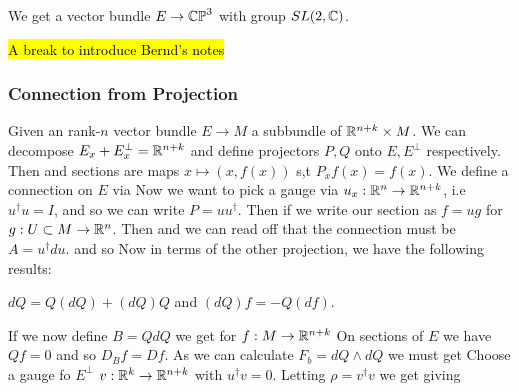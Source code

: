 \documentclass{article}
\begin{document}
\begin{corollary}
	We get a vector bundle $E\to \mathbb{CP}^3$ with group $SL(2,\mathbb{C})$.
\end{corollary}


\hl{A break to introduce Bernd's notes}

\subsubsection{Connection from Projection}
Given an rank-$n$ vector bundle $E \to M$ a subbundle of $\mathbb{R}^{n+k} \times M$. We can decompose $E_x + E_x^\perp = \mathbb{R}^{n+k}$ and define projectors $P,Q$ onto $E,E^\perp$ respectively. Then 
and sections are maps $x \mapsto (x,f(x))$ s,t $P_xf(x) = f(x)$. We define a connection on $E$ via 
Now we want to pick a gauge via $u_x: \mathbb{R}^n \to \mathbb{R}^{n+k}$, i.e $u^\dagger u = I$, and so we can write $P = uu^\dagger$. Then if we write our section as $f=ug$ for $g:U \subset M \to \mathbb{R}^n$. Then
and we can read off that the connection must be $A = u^\dagger du$. and so 
Now in terms of the other projection, we have the following results:
\begin{lemma}
	$dQ = Q(dQ) + (dQ)Q$ and $(dQ)f = -Q(df)$. 
\end{lemma} 
If we now define $B = QdQ$ we get for $f: M \to \mathbb{R}^{n+k}$ 
On sections of $E$ we have $Qf=0$ and so $D_B f = Df$. As we can calculate $F_b = dQ \wedge dQ$ we must get 
Choose a gauge fo $E^\perp$ $v:\mathbb{R}^k \to \mathbb{R}^{n+k}$ with $u^\dagger v= 0$. Letting $\rho = v^\dagger v$ we get 
giving 
\end{document}
